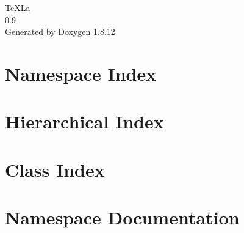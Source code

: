 \documentclass[twoside]{book}
\newcommand{\+}{\discretionary{\mbox{\scriptsize$\hookleftarrow$}}{}{}}
\newcommand{\clearemptydoublepage}{%
  \newpage{\pagestyle{empty}\cleardoublepage}%
}
\begin{document}
\hypersetup{pageanchor=false,
             bookmarksnumbered=true,
             pdfencoding=unicode
            }
\begin{titlepage}
\vspace*{7cm}
\begin{center}%
{\Large Te\+X\+La \\[1ex]\large 0.\+9 }\\
\vspace*{1cm}
{\large Generated by Doxygen 1.8.12}\\
\end{center}
\end{titlepage}
\clearemptydoublepage
{}
\tableofcontents
\clearemptydoublepage
{}
\hypersetup{pageanchor=true}

\chapter{Namespace Index}

\chapter{Hierarchical Index}

\chapter{Class Index}

\chapter{Namespace Documentation}


\end{document}
